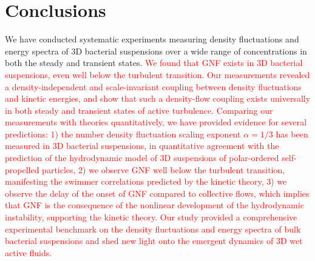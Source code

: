 \documentclass[twocolumn,aps,prx,amsmath,amssymb,longbibliography,superscriptaddress]{revtex4-2}
\begin{document}
\section{Conclusions}

We have conducted systematic experiments measuring density fluctuations and energy spectra of 3D bacterial suspensions over a wide range of concentrations in both the steady and transient states.
\textcolor{red}{We found that GNF exists in 3D bacterial suspensions, even well below the turbulent transition. Our measurements revealed a density-independent and scale-invariant coupling between density fluctuations and kinetic energies, and show that such a density-flow coupling exists universally in both steady and transient states of active turbulence. Comparing our measurements with theories quantitatively, we have provided evidence for several predictions:
1) the number density fluctuation scaling exponent $\alpha=1/3$ has been measured in 3D bacterial suspensions, in quantitative agreement with the prediction of the hydrodynamic model of 3D suspensions of polar-ordered self-propelled particles,
2) we observe GNF well below the turbulent transition, manifesting the swimmer correlations predicted by the kinetic theory,
3) we observe the delay of the onset of GNF compared to collective flows, which implies that GNF is the consequence of the nonlinear development of the hydrodynamic instability, supporting the kinetic theory. Our study provided a comprehensive experimental benchmark on the density fluctuations and energy spectra of bulk bacterial suspensions and shed new light onto the emergent dynamics of 3D wet active fluids.}
\end{document}
